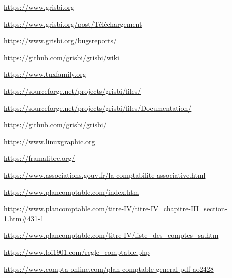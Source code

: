 
%

\urldef{\urlGrisbi}%
\url{https://www.grisbi.org}

\urldef{\urlGrisbiTelechargement}%
\url{https://www.grisbi.org/post/Téléchargement}

\urldef{\urlBugTracker}%
\url{https://www.grisbi.org/bugsreports/}

\urldef{\urlGrisbiWiki}%
\url{https://github.com/grisbi/grisbi/wiki}

\urldef{\urlTuxFamily}%
\url{https://www.tuxfamily.org}

\urldef{\urlSourceForge}%
\url{https://sourceforge.net/projects/grisbi/files/}

\urldef{\urlSourceForgeDocumentation}%
\url{https://sourceforge.net/projects/grisbi/files/Documentation/}

\urldef{\urlGitHubGrisbi}%
\url{https://github.com/grisbi/grisbi/}

\urldef{\urlLinuxGraphic}%
\url{https://www.linuxgraphic.org}

\urldef{\urlFramasoftLogiciels}%
\url{https://framalibre.org/}

\urldef{\urlAssociationsGouv}%
\url{https://www.associations.gouv.fr/la-comptabilite-associative.html}

\urldef{\urlPlanComptable}%
\url{https://www.plancomptable.com/index.htm}

\urldef{\urlPlanDeComptes}%
\url{https://www.plancomptable.com/titre-IV/titre-IV_chapitre-III_section-1.htm#431-1}

\urldef{\urlListeComptes}%
\url{https://www.plancomptable.com/titre-IV/liste_des_comptes_sa.htm}

\urldef{\urlMaisonAssociations}%
\url{https://www.loi1901.com/regle_comptable.php}

\urldef{\urlComptaOnLine}%
\url{https://www.compta-online.com/plan-comptable-general-pdf-ao2428}

